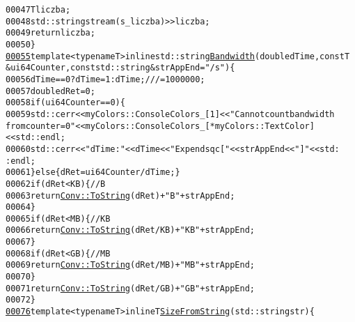 \begin{footnotesize}
\begin{alltt}
00047         T liczba;
00048         std::stringstream(s\_liczba) >> liczba;
00049         \textcolor{keywordflow}{return} liczba;
00050         \}
\hypertarget{myConv_8hpp_source_l00055}{}\hyperlink{group__libbuskol_gadfc1b8134cb22f8251e3e104a9d82f18}{00055}         \textcolor{keyword}{template} <\textcolor{keyword}{typename} T> \textcolor{keyword}{inline} std::string \hyperlink{group__libbuskol_gadfc1b8134cb22f8251e3e104a9d82f18}{Bandwidth}(\textcolor{keywordtype}{double} dTime ,\textcolor{keyword}{const} T 
      &ui64Counter,\textcolor{keyword}{const} std::string &strAppEnd = \textcolor{stringliteral}{"/s"})\{
00056             dTime == 0 ? dTime = 1 : dTime;\textcolor{comment}{// /= 1000000;}
00057             \textcolor{keywordtype}{double} dRet = 0;
00058             \textcolor{keywordflow}{if} ( ui64Counter == 0)\{
00059                 std::cerr<<myColors::ConsoleColors\_[1]<<\textcolor{stringliteral}{"Can not count bandwidth 
      from counter = 0"}<<myColors::ConsoleColors\_[*myColors::TextColor]<<std::endl;
00060                 std::cerr<<\textcolor{stringliteral}{"dTime:"}<<dTime<<\textcolor{stringliteral}{" Exp end sqc["}<<strAppEnd<<\textcolor{stringliteral}{"]"}<<std:
      :endl;
00061             \}\textcolor{keywordflow}{else}\{ dRet = ui64Counter / dTime ;\}
00062             \textcolor{keywordflow}{if} (dRet < KB )\{ \textcolor{comment}{//B}
00063                 \textcolor{keywordflow}{return} \hyperlink{group__libbuskol_ga0b261d6de4c26434d56ba40d00daa68a}{Conv::ToString}(dRet)+\textcolor{stringliteral}{"B"}+strAppEnd;
00064             \}
00065             \textcolor{keywordflow}{if} ( dRet < MB )\{\textcolor{comment}{//KB}
00066                 \textcolor{keywordflow}{return} \hyperlink{group__libbuskol_ga0b261d6de4c26434d56ba40d00daa68a}{Conv::ToString}(dRet/KB)+\textcolor{stringliteral}{"KB"}+strAppEnd;
00067             \}
00068             \textcolor{keywordflow}{if}( dRet < GB )\{\textcolor{comment}{//MB}
00069                 \textcolor{keywordflow}{return} \hyperlink{group__libbuskol_ga0b261d6de4c26434d56ba40d00daa68a}{Conv::ToString}(dRet/MB)+\textcolor{stringliteral}{"MB"}+strAppEnd;
00070             \}
00071             \textcolor{keywordflow}{return} \hyperlink{group__libbuskol_ga0b261d6de4c26434d56ba40d00daa68a}{Conv::ToString}(dRet/GB)+\textcolor{stringliteral}{"GB"}+strAppEnd;
00072         \}
\hypertarget{myConv_8hpp_source_l00076}{}\hyperlink{group__libbuskol_gaed62db74cfcb8c4767ed9f8ddd19cbcb}{00076}         \textcolor{keyword}{template} <\textcolor{keyword}{typename} T> \textcolor{keyword}{inline} T \hyperlink{group__libbuskol_gaed62db74cfcb8c4767ed9f8ddd19cbcb}{SizeFromString}(std::string str)\{

\end{alltt}
\end{footnotesize}

